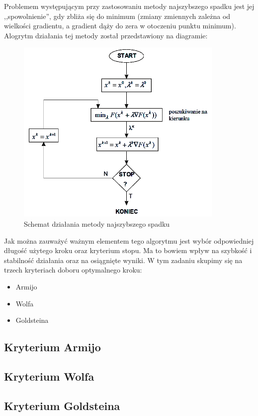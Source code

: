 \documentclass{classrep}
\begin{document}
Problemem występującym przy zastosowaniu metody najszybszego spadku jest jej ,,spowolnienie'', gdy zbliża się do minimum (zmiany zmiennych zależna od wielkości gradientu, a gradient dąży do zera w otoczeniu punktu minimum). Alogrytm działania tej metody został przedstawiony na diagramie:
\begin{figure}[h!]
\centering
\includegraphics[width=10cm]{obrazy/metodaNS_algo.png} 
\caption{Schemat działania metody najszybszego spadku}
\label{fig:metodaNS_algo}
\end{figure}

Jak można zauważyć ważnym elementem tego algorytmu jest wybór odpowiedniej długość użytego kroku oraz kryterium stopu. Ma to bowiem wpływ na szybkość i stabilność działania oraz na osiągnięte wyniki. W tym zadaniu skupimy się na trzech kryteriach doboru optymalnego kroku:
\begin{itemize}
\item Armijo
\item Wolfa
\item Goldsteina
\end{itemize}

\subsection{Kryterium Armijo}

\subsection{Kryterium Wolfa}

\subsection{Kryterium Goldsteina}
\end{document}
